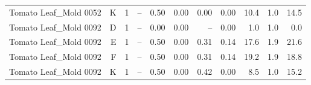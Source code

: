 \begin{table}[H]
{\begin{tabular}{lrrrrrrrrrr}
Tomato Leaf\_Mold 0052 & K & 1 & -- & 0.50 & 0.00 & 0.00 & 0.00 & 10.4 & 1.0 & 14.5 \\
Tomato Leaf\_Mold 0092 & D & 1 & -- & 0.00 & 0.00 & -- & 0.00 & 1.0 & 1.0 & 0.0 \\
Tomato Leaf\_Mold 0092 & E & 1 & -- & 0.50 & 0.00 & 0.31 & 0.14 & 17.6 & 1.9 & 21.6 \\
Tomato Leaf\_Mold 0092 & F & 1 & -- & 0.50 & 0.00 & 0.31 & 0.14 & 19.2 & 1.9 & 18.8 \\
Tomato Leaf\_Mold 0092 & K & 1 & -- & 0.50 & 0.00 & 0.42 & 0.00 & 8.5 & 1.0 & 15.2 \\
\bottomrule\end{tabular}}\end{table}
